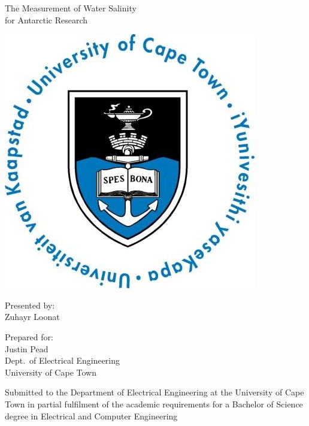 \documentclass[a4paper,12pt]{report}
\begin{document}
\thispagestyle{empty}
    {\Huge \begin{center}
        The Measurement of Water Salinity \\for Antarctic Research
    \end{center}}

    \vskip 5mm
    \begin{center}
        \includegraphics[scale = 0.35]{Figures/uctLogo.png}
    \end{center}

    \vskip 5mm
    \begin{center}
        Presented by:\\
        Zuhayr Loonat		%
    \end{center}

    \vskip 10mm
    \begin{center}
        Prepared for:\\
        Justin Pead\\ 		%
        Dept.~of Electrical Engineering\\University of Cape Town
    \end{center}


    \vskip 10mm
    \begin{center}
        Submitted to the Department of Electrical Engineering at the University of Cape Town in partial
        fulfilment of the academic requirements for a Bachelor of Science degree in Electrical and Computer Engineering
    \end{center}
\end{document}
